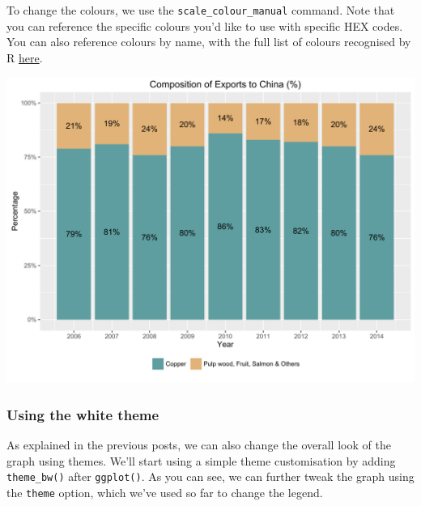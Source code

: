 \documentclass[]{article}
\newenvironment{Shaded}{\begin{snugshade}}{\end{snugshade}}
\newcommand{\KeywordTok}[1]{\textcolor[rgb]{0.13,0.29,0.53}{\textbf{{#1}}}}
\newcommand{\DataTypeTok}[1]{\textcolor[rgb]{0.13,0.29,0.53}{{#1}}}
\newcommand{\StringTok}[1]{\textcolor[rgb]{0.31,0.60,0.02}{{#1}}}
\newcommand{\NormalTok}[1]{{#1}}
\begin{document}
To change the colours, we use the \texttt{scale\_colour\_manual}
command. Note that you can reference the specific colours you'd like to
use with specific HEX codes. You can also reference colours by name,
with the full list of colours recognised by R
\href{http://www.stat.columbia.edu/~tzheng/files/Rcolor.pdf}{here}.

\begin{Shaded}
\end{Shaded}

\begin{center}\includegraphics{0_all_posts_pdf/stacked_8-1} \end{center}

\subsubsection{Using the white theme}\label{using-the-white-theme-3}

As explained in the previous posts, we can also change the overall look
of the graph using themes. We'll start using a simple theme
customisation by adding \texttt{theme\_bw()} after \texttt{ggplot()}. As
you can see, we can further tweak the graph using the \texttt{theme}
option, which we've used so far to change the legend.
\end{document}
